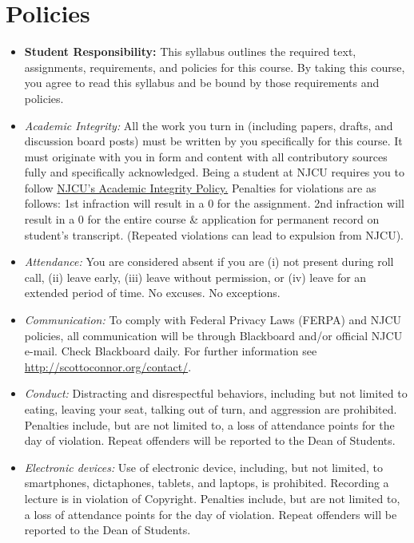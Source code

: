 \documentclass[article,oneside]{memoir}
\begin{document}
\section{Policies}

\begin{itemize}

\item \textbf{Student Responsibility:} This syllabus outlines the required text, assignments, requirements, and policies for this course. By taking this course, you agree to read this syllabus and be bound by those requirements and policies. 

 \item \textit{Academic Integrity:} All the work you turn in (including papers, drafts, and discussion board posts) must be written by you specifically for this course. It must originate with you in form and content with all contributory sources fully and specifically acknowledged. Being a student at NJCU requires you to follow \href{http://scottoconnor.org/resources/Plagiarism.pdf}{NJCU's Academic Integrity Policy.} Penalties for violations are as follows: 1st infraction will result in a 0 for the assignment.  2nd infraction will result in a 0 for the entire course \& application for permanent record on student's transcript. (Repeated violations can lead to expulsion from NJCU). 

\item \textit{Attendance:} You are considered absent if you are (i) not present during roll call, (ii) leave early, (iii) leave without permission, or (iv) leave for an extended period of time. No excuses. No exceptions.

\item \textit{Communication:} To comply with Federal Privacy Laws (FERPA) and NJCU policies, all communication will be through Blackboard and/or official NJCU e-mail. Check Blackboard daily. For further information see \href{http://scottoconnor.org/contact/}{http://scottoconnor.org/contact/}.

\item \textit{Conduct:} Distracting and disrespectful behaviors, including but not limited to eating, leaving your seat, talking out of turn, and aggression are prohibited. Penalties include, but are not limited to, a loss of attendance points for the day of violation. Repeat offenders will be reported to the Dean of Students. 

\item \textit{Electronic devices:} Use of electronic device, including, but not limited, to smartphones, dictaphones, tablets, and laptops, is prohibited. Recording a lecture is in violation of Copyright. Penalties include, but are not limited to, a loss of attendance points for the day of violation. Repeat offenders will be reported to the Dean of Students.


\end{itemize}
\end{document}
